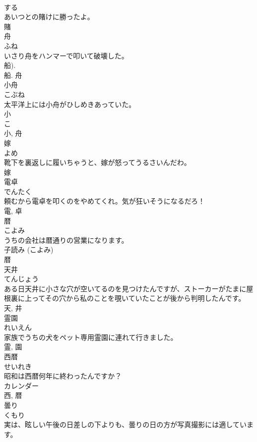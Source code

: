 \documentclass[8pt]{extreport}
\begin{document}
\begin{CJK}{UTF8}{min}
\\	する 
\\	あいつとの賭けに勝ったよ。	
\\	賭	
\\	舟	
\\	ふね	
\\	いさり舟をハンマーで叩いて破壊した。	
\\	船). 
\\	船.	舟	
\\	小舟	
\\	こぶね	
\\	太平洋上には小舟がひしめきあっていた。	
\\	小 
\\	こ 
\\	小, 舟	
\\	嫁	
\\	よめ	
\\	靴下を裏返しに履いちゃうと、嫁が怒ってうるさいんだわ。	
\\	嫁	
\\	電卓	
\\	でんたく	
\\	頼むから電卓を叩くのをやめてくれ。気が狂いそうになるだろ！	
\\	電, 卓	
\\	暦	
\\	こよみ	
\\	うちの会社は暦通りの営業になります。	
\\	子読み (こよみ) 
\\	暦	
\\	天井	
\\	てんじょう	
\\	ある日天井に小さな穴が空いてるのを見つけたんですが、ストーカーがたまに屋根裏に上ってその穴から私のことを覗いていたことが後から判明したんです。	
\\	天, 井	
\\	霊園	
\\	れいえん	
\\	家族でうちの犬をペット専用霊園に連れて行きました。	
\\	霊, 園	
\\	西暦	
\\	せいれき	
\\	昭和は西暦何年に終わったんですか？	
\\	カレンダー 
\\	西, 暦	
\\	曇り	
\\	くもり	
\\	実は、眩しい午後の日差しの下よりも、曇りの日の方が写真撮影には適しています。	

\end{CJK}
\end{document}
